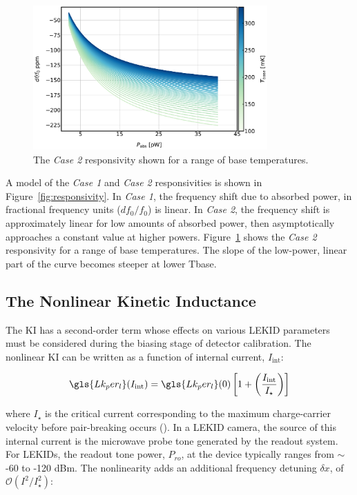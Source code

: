 \begin{figure}[!htbp]
\centering
\includegraphics[width=0.8\textwidth]{figures/kid_model/resp_case2_T}
\caption[~The case~2 responsivity shown for a range of base temperatures.]{The \textit{Case 2} responsivity shown for a range of base temperatures.}
\label{fig:case 2 responsivity}
\end{figure}

A model of the \textit{Case 1} and \textit{Case 2} responsivities is shown in Figure~\ref{fig:responsivity}. In \textit{Case 1}, the frequency shift due to absorbed power, in fractional frequency units ($df_{0}/f_{0}$) is linear. In \textit{Case 2}, the frequency shift is approximately linear for low amounts of absorbed power, then asymptotically approaches a constant value at higher powers. Figure~\ref{fig:case 2 responsivity} shows the \textit{Case 2} responsivity for a range of base temperatures. The slope of the low-power, linear part of the curve becomes steeper at lower \gls{Tbase}.

\subsection{The Nonlinear Kinetic Inductance}\label{nonlinearKI}

The KI has a second-order term whose effects on various LEKID parameters must be considered during the biasing stage of detector calibration. The nonlinear KI can be written as a function of internal current, $I_{\mathrm{int}}$:

\begin{equation} \label{eq:nonlinear KI}
  \gls{Lk_per_l}(I_{\mathrm{int}}) = \gls{Lk_per_l}(0) \left[ 1 + \left( \frac{I_{\mathrm{int}}}{I_{\star}} \right) \right]
\end{equation}

where $I_{\star}$ is the critical current corresponding to the maximum charge-carrier velocity before pair-breaking occurs (\citet{tinkham2004introduction,anlage1989current,annunziata2010tunable}). In a LEKID camera, the source of this internal current is the microwave probe tone generated by the readout system. For LEKIDs, the readout tone power, $P_{ro}$, at the device typically ranges from $\sim$-60 to -120 dBm.
The nonlinearity adds an additional frequency detuning $\delta x$, of $\mathcal{O}(I^{2}/I_{\star}^{2})$:

